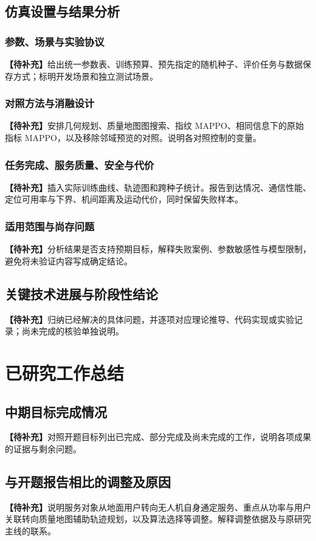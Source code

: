 \documentclass[UTF8,a4paper,12pt,fontset=fandol]{ctexart}
\newcommand{\pending}[1]{\par\noindent\textbf{【待补充】}#1\par}
\begin{document}
\subsection{仿真设置与结果分析}
\subsubsection{参数、场景与实验协议}
\pending{给出统一参数表、训练预算、预先指定的随机种子、评价任务与数据保存方式；标明开发场景和独立测试场景。}
\subsubsection{对照方法与消融设计}
\pending{安排几何规划、质量地图图搜索、指纹 MAPPO、相同信息下的原始指标 MAPPO，以及移除邻域预览的对照。说明各对照控制的变量。}
\subsubsection{任务完成、服务质量、安全与代价}
\pending{插入实际训练曲线、轨迹图和跨种子统计。报告到达情况、通信性能、定位可用率与下界、机间距离及运动代价，同时保留失败样本。}
\subsubsection{适用范围与尚存问题}
\pending{分析结果是否支持预期目标，解释失败案例、参数敏感性与模型限制，避免将未验证内容写成确定结论。}

\subsection{关键技术进展与阶段性结论}
\pending{归纳已经解决的具体问题，并逐项对应理论推导、代码实现或实验记录；尚未完成的核验单独说明。}

\section{已研究工作总结}

\subsection{中期目标完成情况}
\pending{对照开题目标列出已完成、部分完成及尚未完成的工作，说明各项成果的证据与剩余问题。}

\subsection{与开题报告相比的调整及原因}
\pending{说明服务对象从地面用户转向无人机自身通定服务、重点从功率与用户关联转向质量地图辅助轨迹规划，以及算法选择等调整。解释调整依据及与原研究主线的联系。}
\end{document}
